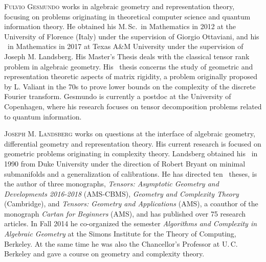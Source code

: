 \documentclass{toc}
\begin{document}
\begin{tocaboutauthors}
\begin{tocabout}[gesmundo]
  \textsc{Fulvio Gesmundo} works in algebraic geometry and representation theory, focusing on problems originating in theoretical computer science and quantum information theory. He obtained his M.\,Sc.\ in Mathematics in 2012 at
the    %
University of Florence (Italy) under the supervision of Giorgio Ottaviani, and his
  \phd\ in Mathematics in 2017 at Texas A\&M University under the supervision of Joseph M. Landsberg. His Master's Thesis deals with the classical tensor rank problem in algebraic geometry. His \phd\ thesis concerns the study of geometric and representation theoretic aspects of matrix rigidity, a problem originally proposed by L. Valiant in the 70s to
%
prove  %
lower bounds on the complexity of the discrete Fourier transform. Gesmundo is currently a postdoc at
the   %
University of Copenhagen, where his research focuses
on tensor decomposition problems related to quantum information. 
\end{tocabout}
\begin{tocabout}[landsberg]
%
\textsc{Joseph M. Landsberg}    %
works on questions at the interface of algebraic geometry, differential geometry and representation theory. His current research is focused on geometric problems originating in complexity theory. Landsberg obtained his \phd\ in 1990 from Duke University under the direction of Robert Bryant on minimal submanifolds and a generalization of calibrations. He has directed ten \phd\ theses, is the author of three monographs,
\emph{Tensors: Asymptotic Geometry and Developments 2016-2018} (AMS-CBMS),
\emph{Geometry and Complexity Theory} (Cambridge),
and \emph{Tensors: Geometry and Applications} (AMS), 
a coauthor of the monograph 
\emph{Cartan for Beginners} (AMS),  
and has published over 75 research articles.
In   %
Fall 2014 he
co-organized the semester  
\emph{Algorithms and Complexity in Algebraic Geometry} 
at the Simons Institute for the Theory of Computing, Berkeley.
At the same time he was also the Chancellor's Professor
at U.\,C. Berkeley and gave a
course on geometry and complexity theory.
\end{tocabout}
\end{tocaboutauthors}
\end{document}
